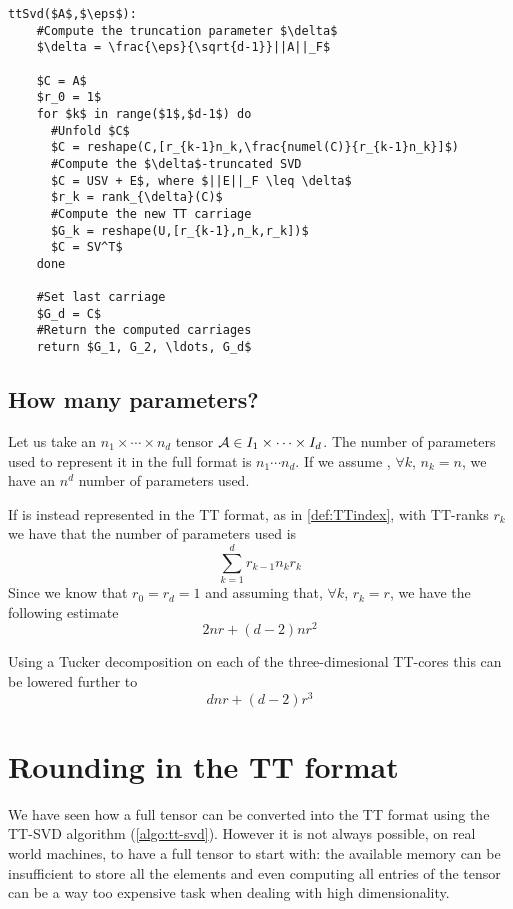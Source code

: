 \begin{lstlisting}[float, caption=TT-SVD compression algorithm, label=algo:tt-svd, title=TT-SVD compression algorithm]
  ttSvd($A$,$\eps$):
    #Compute the truncation parameter $\delta$
    $\delta = \frac{\eps}{\sqrt{d-1}}||A||_F$
  
    $C = A$
    $r_0 = 1$
    for $k$ in range($1$,$d-1$) do
      #Unfold $C$
      $C = reshape(C,[r_{k-1}n_k,\frac{numel(C)}{r_{k-1}n_k}]$)
      #Compute the $\delta$-truncated SVD
      $C = USV + E$, where $||E||_F \leq \delta$
      $r_k = rank_{\delta}(C)$
      #Compute the new TT carriage
      $G_k = reshape(U,[r_{k-1},n_k,r_k])$
      $C = SV^T$
    done
    
    #Set last carriage
    $G_d = C$
    #Return the computed carriages
    return $G_1, G_2, \ldots, G_d$
\end{lstlisting}

\subsection{How many parameters?}
Let us take an $n_1 \times \cdots \times n_d$ tensor $\mathcal{A} \in I_1 \times \cdots \times I_d$. The number of parameters used to represent it in the full format is $n_1 \cdots n_d$. If we assume , $\forall k$, $n_k  = n$, we have an $n^d$ number of parameters used.

If \A is instead represented in the TT format, as in \ref{def:TTindex}, with TT-ranks $r_k$ we have that the number of parameters used is
\begin{equation*}
  \sum_{k=1}^d r_{k-1} n_k r_k
\end{equation*}
Since we know that $r_0 = r_d = 1$ and assuming that, $\forall k$, $r_k = r$, we have the following estimate
\begin{equation*}
  2nr + (d-2)nr^2
\end{equation*}

Using a Tucker decomposition on each of the three-dimesional TT-cores this can be lowered further to
\begin{equation*}
  dnr + (d-2)r^3
\end{equation*}

\section{Rounding in the TT format}
We have seen how a full tensor can be converted into the TT format using the TT-SVD algorithm (\ref{algo:tt-svd}). However it is not always possible, on real world machines, to have a full tensor to start with: the available memory can be insufficient to store all the elements and even computing all entries of the tensor can be a way too expensive task when dealing with high dimensionality.

